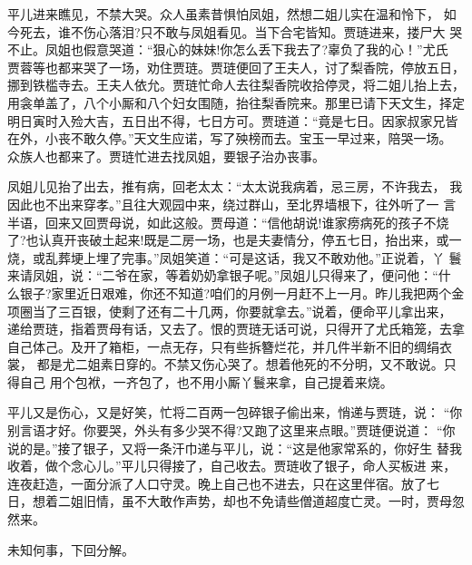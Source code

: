 平儿进来瞧见，不禁大哭。众人虽素昔惧怕凤姐，然想二姐儿实在温和怜下，
如今死去，谁不伤心落泪?只不敢与凤姐看见。当下合宅皆知。贾琏进来，搂尸大
哭不止。凤姐也假意哭道：“狠心的妹妹!你怎么丢下我去了?辜负了我的心！”尤氏
贾蓉等也都来哭了一场，劝住贾琏。贾琏便回了王夫人，讨了梨香院，停放五日，
挪到铁槛寺去。王夫人依允。贾琏忙命人去往梨香院收拾停灵，将二姐儿抬上去，
用衾单盖了，八个小厮和八个妇女围随，抬往梨香院来。那里已请下天文生，择定
明日寅时入殓大吉，五日出不得，七日方可。贾琏道：“竟是七日。因家叔家兄皆
在外，小丧不敢久停。”天文生应诺，写了殃榜而去。宝玉一早过来，陪哭一场。
众族人也都来了。贾琏忙进去找凤姐，要银子治办丧事。

凤姐儿见抬了出去，推有病，回老太太：“太太说我病着，忌三房，不许我去，
我因此也不出来穿孝。”且往大观园中来，绕过群山，至北界墙根下，往外听了一
言半语，回来又回贾母说，如此这般。贾母道：“信他胡说!谁家痨病死的孩子不烧
了?也认真开丧破土起来!既是二房一场，也是夫妻情分，停五七日，抬出来，或一
烧，或乱葬埂上埋了完事。”凤姐笑道：“可是这话，我又不敢劝他。”正说着，丫
鬟来请凤姐，说：“二爷在家，等着奶奶拿银子呢。”凤姐儿只得来了，便问他：“什
么银子?家里近日艰难，你还不知道?咱们的月例一月赶不上一月。昨儿我把两个金
项圈当了三百银，使剩了还有二十几两，你要就拿去。”说着，便命平儿拿出来，
递给贾琏，指着贾母有话，又去了。恨的贾琏无话可说，只得开了尤氏箱笼，去拿
自己体己。及开了箱柜，一点无存，只有些拆簪烂花，并几件半新不旧的绸绢衣裳，
都是尤二姐素日穿的。不禁又伤心哭了。想着他死的不分明，又不敢说。只得自己
用个包袱，一齐包了，也不用小厮丫鬟来拿，自己提着来烧。

平儿又是伤心，又是好笑，忙将二百两一包碎银子偷出来，悄递与贾琏，说：
“你别言语才好。你要哭，外头有多少哭不得?又跑了这里来点眼。”贾琏便说道：
“你说的是。”接了银子，又将一条汗巾递与平儿，说：“这是他家常系的，你好生
替我收着，做个念心儿。”平儿只得接了，自己收去。贾琏收了银子，命人买板进
来，连夜赶造，一面分派了人口守灵。晚上自己也不进去，只在这里伴宿。放了七
日，想着二姐旧情，虽不大敢作声势，却也不免请些僧道超度亡灵。一时，贾母忽
然来。

未知何事，下回分解。